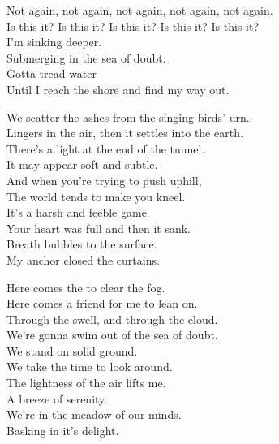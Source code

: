 Not again, not again, not again, not again, not again. \\
Is this it? Is this it? Is this it? Is this it? Is this it? \\

I'm sinking deeper. \\
Submerging in the sea of doubt. \\
Gotta tread water \\
Until I reach the shore and find my way out. \\


We scatter the ashes from the singing birds' urn. \\
Lingers in the air, then it settles into the earth. \\
There's a light at the end of the tunnel. \\
It may appear soft and subtle. \\
And when you're trying to push uphill, \\
The world tends to make you kneel. \\
It's a harsh and feeble game. \\
Your heart was full and then it sank. \\
Breath bubbles to the surface. \\
My anchor closed the curtains. \\


Here comes the  to clear the fog. \\
Here comes a friend for me to lean on. \\
Through the swell, and through the cloud. \\
We're gonna swim out of the sea of doubt. \\

We stand on solid ground. \\
We take the time to look around. \\
The lightness of the air lifts me. \\
A breeze of serenity. \\
We're in the meadow of our minds. \\
Basking in it's delight. \\




